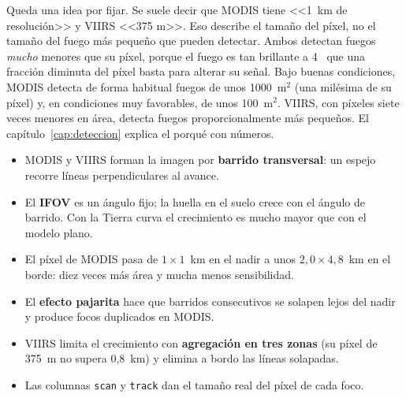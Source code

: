 Queda una idea por fijar. Se suele decir que MODIS tiene <<1~km de resolución>> y VIIRS <<375
m>>. Eso describe el tamaño del píxel, no el tamaño del fuego más pequeño que pueden detectar.
Ambos detectan fuegos \emph{mucho} menores que su píxel, porque el fuego es tan brillante a
4~\um{} que una fracción diminuta del píxel basta para alterar su señal. Bajo buenas
condiciones, MODIS detecta de forma habitual fuegos de unos 1000~m$^2$ (una milésima de su
píxel) y, en condiciones muy favorables, de unos 100~m$^2$. VIIRS, con píxeles siete veces
menores en área, detecta fuegos proporcionalmente más pequeños. El capítulo~\ref{cap:deteccion}
explica el porqué con números.

\resumen

\begin{itemize}
  \item MODIS y VIIRS forman la imagen por \textbf{barrido transversal}: un espejo recorre
  líneas perpendiculares al avance.
  \item El \textbf{IFOV} es un ángulo fijo; la huella en el suelo crece con el ángulo de
  barrido. Con la Tierra curva el crecimiento es mucho mayor que con el modelo plano.
  \item El píxel de MODIS pasa de $1\times1$~km en el nadir a unos $2{,}0\times4{,}8$~km en el
  borde: diez veces más área y mucha menos sensibilidad.
  \item El \textbf{efecto pajarita} hace que barridos consecutivos se solapen lejos del nadir y
  produce focos duplicados en MODIS.
  \item VIIRS limita el crecimiento con \textbf{agregación en tres zonas} (su píxel de 375~m no
  supera 0,8~km) y elimina a bordo las líneas solapadas.
  \item Las columnas \texttt{scan} y \texttt{track} dan el tamaño real del píxel de cada foco.
\end{itemize}

\ejercicios

